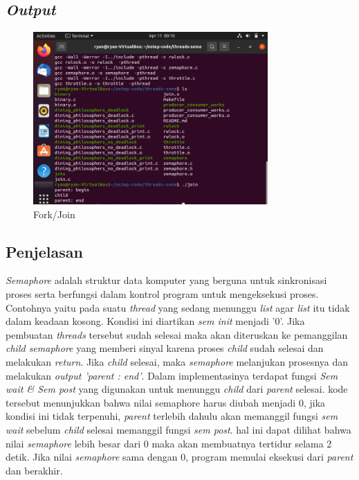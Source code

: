 \documentclass[11pt,a4paper]{article}
\begin{document}
\subsection{\textit{Output}}
\begin{figure}[h]
    \centering
    \includegraphics[width=0.8\textwidth]{Figure/Frok join.png}
    \caption{Fork/Join}
    \label{fig:my_label}
\end{figure}

    
\subsection{Penjelasan}
     \textit{Semaphore} adalah struktur data komputer yang berguna untuk sinkronisasi proses serta berfungsi dalam  kontrol program untuk mengeksekusi proses. Contohnya yaitu pada suatu \textit{thread} yang sedang menunggu \textit{list} agar \textit{list} itu tidak dalam keadaan kosong. Kondisi ini diartikan \textit{sem init} menjadi '0'. Jika pembuatan \textit{threads} tersebut sudah selesai maka akan diteruskan ke pemanggilan \textit{child semaphore} yang memberi sinyal karena proses \textit{child} sudah selesai dan melakukan \textit{return}. Jika \textit{child} selesai, maka \textit{semaphore} melanjukan prosesnya dan melakukan \textit{output 'parent : end'}. Dalam implementasinya terdapat fungsi \textit{Sem wait & Sem post} yang digunakan untuk menunggu \textit{child} dari \textit{parent} selesai. kode tersebut menunjukkan bahwa nilai semaphore harus diubah menjadi 0, jika kondisi ini tidak terpenuhi, \textit{parent} terlebih dahulu akan  memanggil fungsi \textit{sem wait} sebelum \textit{child} selesai memanggil fungsi \textit{sem post}. hal ini dapat dilihat bahwa nilai \textit{semaphore} lebih besar dari 0 maka akan membuatnya tertidur selama 2 detik. Jika nilai \textit{semaphore} sama dengan 0,  program memulai eksekusi dari \textit{parent} dan berakhir.
\end{document}
